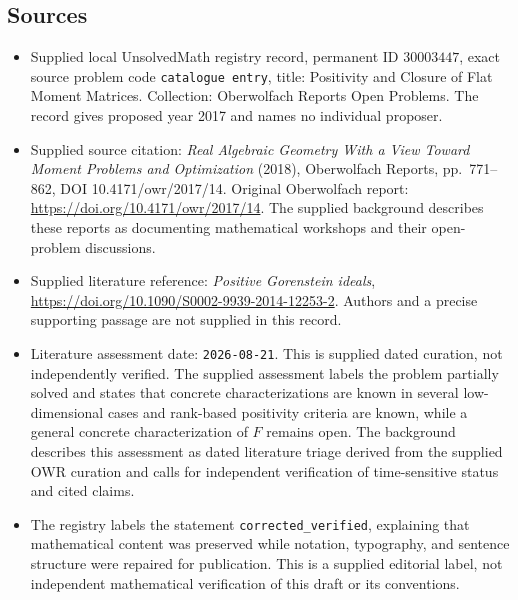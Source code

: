 \documentclass[11pt]{article}
\begin{document}
\subsection{Sources}
\begin{itemize}
\item Supplied local UnsolvedMath registry record, permanent ID \(30003447\), exact source problem code \texttt{catalogue entry}, title: Positivity and Closure of Flat Moment Matrices. Collection: Oberwolfach Reports Open Problems. The record gives proposed year 2017 and names no individual proposer.
\item Supplied source citation: \emph{Real Algebraic Geometry With a View Toward Moment Problems and Optimization} (2018), Oberwolfach Reports, pp.\ 771--862, DOI 10.4171/owr/2017/14. Original Oberwolfach report: \url{https://doi.org/10.4171/owr/2017/14}. The supplied background describes these reports as documenting mathematical workshops and their open-problem discussions.
\item Supplied literature reference: \emph{Positive Gorenstein ideals}, \url{https://doi.org/10.1090/S0002-9939-2014-12253-2}. Authors and a precise supporting passage are not supplied in this record.
\item Literature assessment date: \texttt{2026-08-21}. This is supplied dated curation, not independently verified. The supplied assessment labels the problem partially solved and states that concrete characterizations are known in several low-dimensional cases and rank-based positivity criteria are known, while a general concrete characterization of \(F\) remains open. The background describes this assessment as dated literature triage derived from the supplied OWR curation and calls for independent verification of time-sensitive status and cited claims.
\item The registry labels the statement \texttt{corrected\_verified}, explaining that mathematical content was preserved while notation, typography, and sentence structure were repaired for publication. This is a supplied editorial label, not independent mathematical verification of this draft or its conventions.
\end{itemize}
\end{document}
